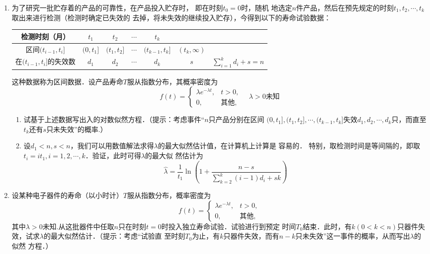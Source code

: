 \documentclass[10pt,a4paper]{article}
\begin{document}
\begin{enumerate}
    \item 为了研究一批贮存着的产品的可靠性，在产品投入贮存时， 即在时刻$t_0=0$时，随机
    地选定$n$件产品，然后在预先规定的时刻$t_1,t_2,\cdots,t_k$取出来进行检测（检测时确定已失效的
    去掉，将未失效的继续投入贮存），今得到以下的寿命试验数据：
    \renewcommand{\arraystretch}{1.4}
    \begin{table}[H]\centering
        \begin{tabular}{c|cccccc}
        \hline
        检测时刻（月）              & $t_1$     & $t_2$       & $\cdots$ & $t_k$           &                &                        \\ \hline
        区间$(t_{i-1},t_i]$    & $(0,t_1]$ & $(t_1,t_2]$ & $\cdots$ & $(t_{k-1},t_k]$ & $(t_k,\infty)$ &                        \\ \hline
        在$(t_{i-1},t_i]$的失效数 & $d_1$     & $d_2$    & $\cdots$ & $d_k$           & $s$              & $\displaystyle{\sum_{i=1}^k d_i+s=n}$ \\ \hline
        \end{tabular}
    \end{table}
    \renewcommand{\arraystretch}{1.0}
    这种数据称为区间数据．设产品寿命$T$服从指数分布，其概率密度为
    $$f(t)=\left\{\begin{array}{ll}
        \lambda e^{-\lambda t}, & t>0,\\
        0, & \mbox{其他},
    \end{array}\right.\quad \lambda>0\mbox{未知}$$
    \begin{enumerate}
        \item 试基于上述数据写出入的对数似然方程．（提示：考虑事件“$n$只产品分别在区间
        $(0,t_1],(t_1,t_2],\cdots,(t_{k-1},t_k]$失效$d_1,d_2,\cdots,d_k$只，而直至$t_k$还有$s$只未失效”的概率.）
        \item 设$d_1<n,s<n$，我们可以用数值解法求得$\lambda$的最大似然估计值，在计算机上计算是
        容易的． 特别，取检测时间是等间隔的，即取$t_i=it_1,i=1,2,\cdots,k$．验证，此时可得$\lambda$的最大似
        然估计为
        $$\hat{\lambda}=\frac{1}{t_1}\ln\left(1+\frac{n-s}{\displaystyle{\sum_{k=2}^k(i-1)d_i+sk}}\right)$$
    \end{enumerate}  





    \item 设某种电子器件的寿命（以小时计）$T$服从指数分布，概率密度为
    $$f(t)=\left\{\begin{array}{ll}
        \lambda e^{-\lambda t}, & t>0,\\
        0, & \mbox{其他},
    \end{array}\right.$$
    其中$\lambda>0$未知.从这批器件中任取$n$只在时刻$t=0$时投入独立寿命试验．试验进行到预定
    时间$T_0$结束．此时，有$k(0<k<n)$只器件失效，试求$\lambda$的最大似然估计．（提示：考虑“试验直
    至时刻$T_0$为止，有$k$只器件失效，而有$n-k$只未失效”这一事件的概率，从而写出$\lambda$的似然
    方程．）







\end{enumerate}
\end{document}
